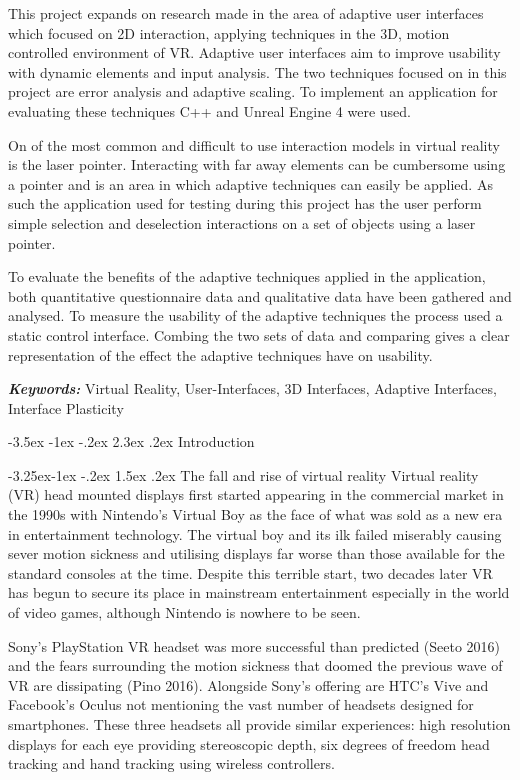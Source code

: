 \documentclass[12pt]{article}
\makeatletter
\providecommand{\keywords}[1]
{\textbf{\textit{Keywords: }} #1}
\renewcommand{\section}{\@startsection {section}{1}{\z@}%
             {-3.5ex \@plus -1ex \@minus -.2ex}%
             {2.3ex \@plus .2ex}%
             {\normalfont\Large\scshape\bfseries}}
\renewcommand{\subsection}{\@startsection{subsection}{2}{\z@}%
             {-3.25ex\@plus -1ex \@minus -.2ex}%
             {1.5ex \@plus .2ex}%
             {\normalfont\large\scshape\bfseries}}
\makeatother
\begin{document}
This project expands on research made in the area of adaptive user interfaces which focused on 2D interaction, applying techniques in the 3D, motion controlled environment of VR. Adaptive user interfaces aim to improve usability with dynamic elements and input analysis. The two techniques focused on in this project are error analysis and adaptive scaling. To implement an application for evaluating these techniques C++ and Unreal Engine 4 were used.

On of the most common and difficult to use interaction models in virtual reality is the laser pointer. Interacting with far away elements can be cumbersome using a pointer and is an area in which adaptive techniques can easily be applied. As such the application used for testing during this project has the user perform simple selection and deselection interactions on a set of objects using a laser pointer.

To evaluate the benefits of the adaptive techniques applied in the application, both quantitative questionnaire data and qualitative data have been gathered and analysed. To measure the usability of the adaptive techniques the process used a static control interface. Combing the two sets of data and comparing gives a clear representation of the effect the adaptive techniques have on usability.

\keywords{Virtual Reality, User-Interfaces, 3D Interfaces, Adaptive Interfaces, Interface Plasticity}

\section{Introduction}

\subsection{The fall and rise of virtual reality}
Virtual reality (VR) head mounted displays first started appearing in the commercial market in the 1990s with Nintendo's Virtual Boy as the face of what was sold as a new era in entertainment technology. The virtual boy and its ilk failed miserably causing sever motion sickness and utilising displays far worse than those available for the standard consoles at the time. Despite this terrible start, two decades later VR has begun to secure its place in mainstream entertainment especially in the world of video games, although Nintendo is nowhere to be seen. 

Sony's PlayStation VR headset was more successful than predicted (Seeto 2016) and the fears surrounding the motion sickness that doomed the previous wave of VR are dissipating (Pino 2016). Alongside Sony's offering are HTC's Vive and Facebook's Oculus not mentioning the vast number of headsets designed for smartphones. These three headsets all provide similar experiences: high resolution displays for each eye providing stereoscopic depth, six degrees of freedom head tracking and hand tracking using wireless controllers. 
\end{document}
